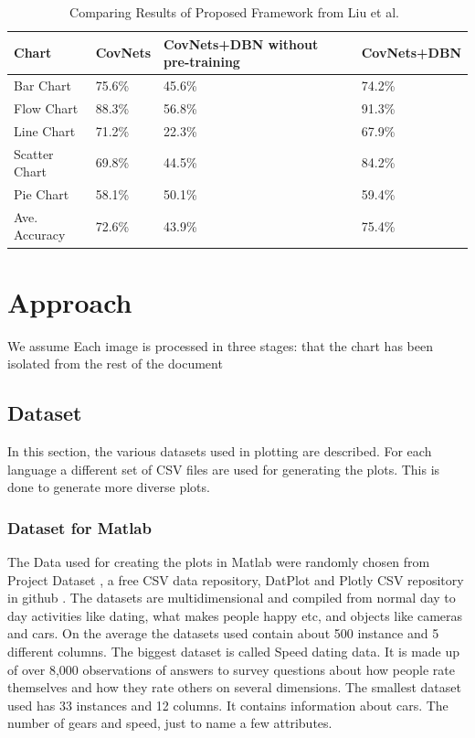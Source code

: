 \documentclass[12pt, a4paper,oneside]{report}
\begin{document}
\begin{table}[h]
	\centering {} \small
	\begin{tabular}{|p{3cm}|p{3cm}|p{3cm}|p{3cm}|}
		
		\hline
		Chart & CovNets&CovNets+DBN without pre-training & CovNets+DBN \\ \hline
				
		Bar Chart & 75.6\% & 45.6\% & 74.2\% \\ \hline
		Flow Chart & 88.3\%  & 56.8\% & 91.3\%  \\ \hline
		Line Chart  & 71.2\%  & 22.3\% & 67.9\% \\ \hline
	
		Scatter Chart & 69.8\% & 44.5\% & 84.2\% \\ \hline
		Pie Chart & 58.1\%  & 50.1\% & 59.4\%    \\ \hline
		Ave. Accuracy & 72.6\%  & 43.9\% & 75.4\% \\ \hline
		
	\end{tabular}
	\caption {Comparing Results of Proposed Framework from Liu et al.~\cite{liu2015chart} }	
	\label{table:deep}
	
\end{table}


\chapter{Approach}
We assume Each image is processed in three stages:
that the chart has been isolated from the rest of the document

\section{Dataset}
In this section, the various datasets used in plotting are described. For each language a different set of CSV files are used for generating the plots. This is done to generate more diverse plots.

\subsection{Dataset for Matlab}
The Data used for creating the plots in Matlab were randomly chosen from Project Dataset \cite{projectdataset}, a free CSV data repository, DatPlot \cite{datplot} and Plotly CSV repository in github \cite{plotly}. The datasets are multidimensional and compiled from normal day to day activities like dating, what makes people happy etc, and objects like cameras and cars. On the average the datasets used contain about 500 instance and 5 different columns. The biggest dataset is called Speed dating data. It is made up of over 8,000 observations of answers to survey questions about how people rate themselves and how they rate others on several dimensions. The smallest dataset used has 33 instances and 12 columns. It contains information about cars. The number of gears and speed, just to name a few attributes.
\end{document}
